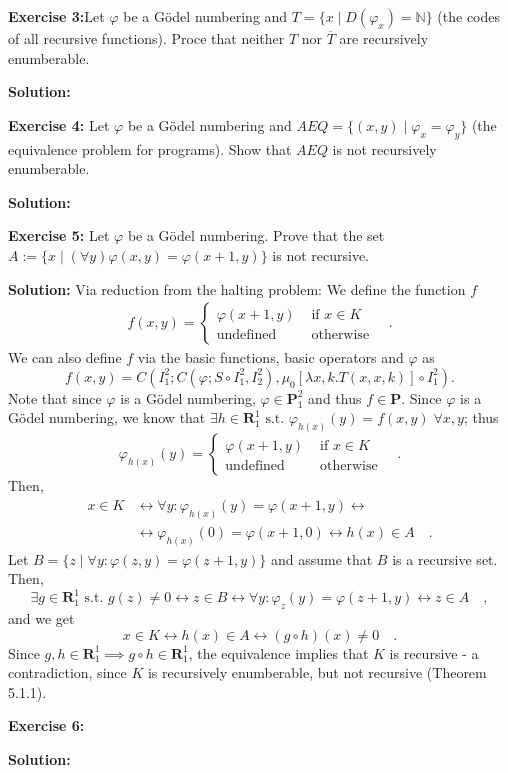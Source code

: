 \documentclass [11pt]{article}
\newcommand{\N}{\ensuremath{\mathbb{N}}}
\newcommand{\R}{\textbf{R}}
\renewcommand{\P}{\textbf{P}}
\newcommand{\lra}{\ensuremath{\leftrightarrow}}
\begin{document}
\bigskip
\noindent
\textbf{Exercise 3:}Let $\varphi$ be a G\"odel numbering and $T = \{ x \mid D(\varphi_x) = \N\}$ (the codes of all recursive functions). Proce that neither $T$ nor $\overline{T}$ are recursively enumberable.

\noindent
\textbf{Solution:}

\bigskip
\noindent
\textbf{Exercise 4:} Let $\varphi$ be a G\"odel numbering and $AEQ = \{(x,y) \mid \varphi_x = \varphi_y \}$ (the equivalence problem for programs). Show that $AEQ$ is not recursively enumberable.

\noindent
\textbf{Solution:}

\bigskip
\noindent
\textbf{Exercise 5:} Let $\varphi$ be a G\"odel numbering. Prove that the set $A:= \{x \mid (\forall y)\varphi(x,y) = \varphi(x+1,y)\}$ is not recursive.

\noindent
\textbf{Solution:} 
Via reduction from the halting problem:
We define the function $f$
\begin{align*}
 f(x,y) = \begin{cases}
           \varphi(x+1,y) & \text{ if } x \in K \\
           \text{undefined} & \text{ otherwise} 
          \end{cases} \quad .
\end{align*} 
We can also define $f$ via the basic functions, basic operators and $\varphi$ as
$$
f(x,y) = C(I^2_1; C(\varphi; S \circ I^2_1, I^2_2), \mu_0 [\lambda x,k.T(x,x,k)]\circ I^2_1).
$$
Note that since $\varphi$ is a G\"odel numbering, $\varphi \in \P^2_1$ and thus $f \in \P$.
Since $\varphi$ is a G\"odel numbering, we know that $\exists h \in \R^1_1 \text{ s.t.\ } \varphi_{h(x)}(y) = f(x,y) \;\forall x,y$; thus
$$
\varphi_{h(x)}(y) = \begin{cases}
           \varphi(x+1,y) & \text{ if } x \in K \\
           \text{undefined} & \text{ otherwise}
          \end{cases} \quad.
$$
Then,
\begin{align*}
x \in K &\lra \forall y: \varphi_{h(x)}(y) = \varphi(x+1,y) \lra \\
&\lra \varphi_{h(x)}(0) = \varphi(x+1,0) \lra h(x) \in A \quad . 
\end{align*}
Let $B = \{z \mid \forall y: \varphi(z,y) =  \varphi(z+1,y)\}$ and assume that $B$ is a recursive set.
Then, 
$$
\exists g \in \R^1_1 \text{ s.t.\ } g(z) \neq 0 \lra z \in B \lra \forall y: \varphi_z(y) = \varphi(z+1,y) \lra z \in A \quad ,
$$
and we get 
$$
x \in K \lra h(x) \in A \lra (g \circ h)(x) \neq 0 \quad .
$$
Since $g,h \in \R^1_1 \implies g\circ h \in \R^1_1$, the equivalence implies that $K$ is recursive - a contradiction, since $K$ is recursively enumberable, but not recursive (Theorem 5.1.1).

\bigskip
\noindent
\textbf{Exercise 6:}

\noindent
\textbf{Solution:}
\end{document}
